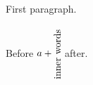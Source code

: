 \documentclass{article}
\begin{document}
First paragraph.

Before $a + \mbox{\rotatebox[origin=c]{90}{inner words \lxmbf}}$ after.
\end{document}
